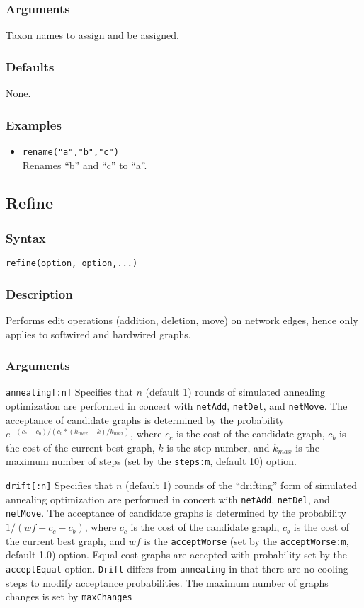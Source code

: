 \documentclass[11pt]{article}
\begin{document}
		\subsubsection{Arguments}
			Taxon names to assign and be assigned.
		\subsubsection{Defaults}
			None.
		\subsubsection{Examples}
			 \begin{itemize}
			 	\item{\texttt{rename("a","b","c")}\\ Renames ``b'' and ``c'' to ``a''. }
			\end{itemize}
		
	\subsection{Refine}
		\subsubsection{Syntax}
		\texttt{refine(option, option,...)}
		\subsubsection{Description}
		Performs edit operations (addition, deletion, move) on network edges, hence only applies to softwired and hardwired graphs.
		\subsubsection{Arguments}
			\noindent \texttt{annealing[:n]} Specifies that $n$ (default 1) rounds of simulated annealing optimization \citep{Metropolisetal1953, Kirkpatricketal1983, Cerny1985} are performed in concert with \texttt{netAdd}, 
			\texttt{netDel}, and \texttt{netMove}.  The acceptance 
			of candidate graphs is determined by the probability $e ^ {- (c_c - c_b)/ (c_b * (k_{max} -k)/ k_{max})}$, where
			$c_c$ is the cost of the candidate graph, $c_b$ is the cost of the current best graph, $k$ is the step number,  
			and $k_{max}$ is the maximum  number of steps (set by the \texttt{steps:m}, default 10) option.
			
			\smallskip		
			\noindent \texttt{drift[:n]} Specifies that $n$ (default 1) rounds of the ``drifting'' form of simulated annealing \citep{goloboff1999} optimization are performed in concert with \texttt{netAdd}, 
			\texttt{netDel}, and \texttt{netMove}.  The acceptance 
			of candidate graphs is determined by the probability $1/ (wf + c_c - c_b)$, where
			$c_c$ is the cost of the candidate graph, $c_b$ is the cost of the current best graph,   
			and $wf$ is the \texttt{acceptWorse} (set by the \texttt{acceptWorse:m}, default 1.0) option. Equal cost graphs are accepted 
			with probability set by the \texttt{acceptEqual} option.  \texttt{Drift} differs from \texttt{annealing} in that there are no cooling steps to modify acceptance probabilities. The maximum number of graphs changes is set by \texttt{maxChanges}
			
\end{document}
